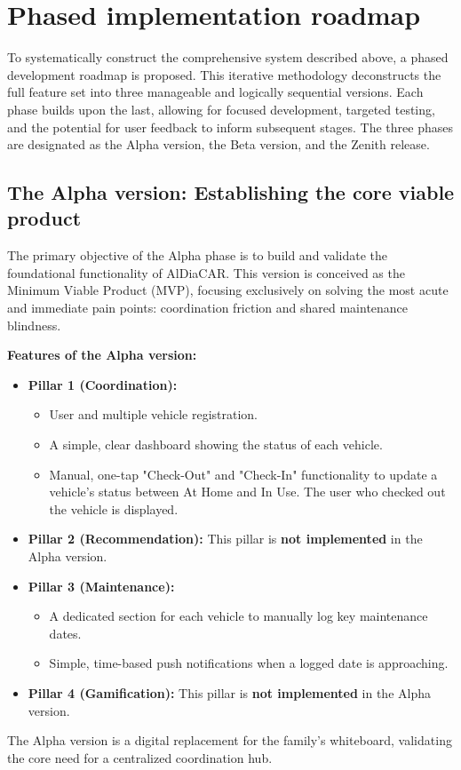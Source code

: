 \section{Phased implementation roadmap}

To systematically construct the comprehensive system described above, a phased development roadmap is proposed. This iterative methodology deconstructs the full feature set into three manageable and logically sequential versions. Each phase builds upon the last, allowing for focused development, targeted testing, and the potential for user feedback to inform subsequent stages. The three phases are designated as the Alpha version, the Beta version, and the Zenith release.

\subsection{The Alpha version: Establishing the core viable product}
The primary objective of the Alpha phase is to build and validate the foundational functionality of AlDiaCAR. This version is conceived as the Minimum Viable Product (MVP), focusing exclusively on solving the most acute and immediate pain points: coordination friction and shared maintenance blindness.
\textgap

\textbf{Features of the Alpha version:}
\begin{itemize}
\item \textbf{Pillar 1 (Coordination):}
\begin{itemize}
\item User and multiple vehicle registration.
\item A simple, clear dashboard showing the status of each vehicle.
\item Manual, one-tap "Check-Out" and "Check-In" functionality to update a vehicle's status between At Home and In Use. The user who checked out the vehicle is displayed.
\end{itemize}
\item \textbf{Pillar 2 (Recommendation):} This pillar is \textbf{not implemented} in the Alpha version.
\item \textbf{Pillar 3 (Maintenance):}
\begin{itemize}
\item A dedicated section for each vehicle to manually log key maintenance dates.
\item Simple, time-based push notifications when a logged date is approaching.
\end{itemize}
\item \textbf{Pillar 4 (Gamification):} This pillar is \textbf{not implemented} in the Alpha version.
\end{itemize}
The Alpha version is a digital replacement for the family's whiteboard, validating the core need for a centralized coordination hub.

